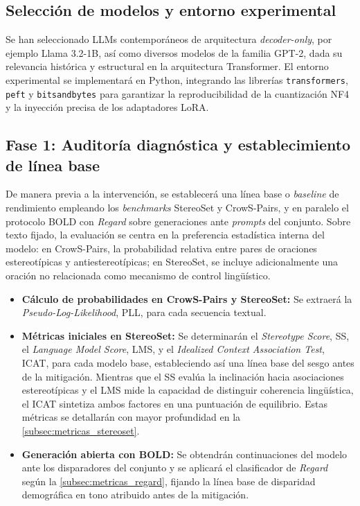 \documentclass[12pt,a4paper]{report}
\begin{document}
\subsection{Selección de modelos y entorno experimental}
\label{subsec:seleccion_entorno}

Se han seleccionado LLMs contemporáneos de arquitectura \textit{decoder-only}, por ejemplo Llama 3.2-1B, así como diversos modelos de la familia GPT-2, dada su relevancia histórica y estructural en la arquitectura Transformer. El entorno experimental se implementará en Python, integrando las librerías \texttt{transformers}, \texttt{peft} y \texttt{bitsandbytes} para garantizar la reproducibilidad de la cuantización NF4 y la inyección precisa de los adaptadores LoRA.

\subsection{Fase 1: Auditoría diagnóstica y establecimiento de línea base}
\label{subsec:fase_deteccion}

De manera previa a la intervención, se establecerá una línea base o \textit{baseline} de rendimiento empleando los \textit{benchmarks} StereoSet y CrowS-Pairs, y en paralelo el protocolo BOLD con \textit{Regard} sobre generaciones ante \textit{prompts} del conjunto. Sobre texto fijado, la evaluación se centra en la preferencia estadística interna del modelo: en CrowS-Pairs, la probabilidad relativa entre pares de oraciones estereotípicas y antiestereotípicas; en StereoSet, se incluye adicionalmente una oración no relacionada como mecanismo de control lingüístico.

\begin{itemize}
    \item \textbf{Cálculo de probabilidades en CrowS-Pairs y StereoSet:} Se extraerá la \textit{Pseudo-Log-Likelihood}, PLL, para cada secuencia textual.
    \item \textbf{Métricas iniciales en StereoSet:} Se determinarán el \textit{Stereotype Score}, SS, el \textit{Language Model Score}, LMS, y
    el \textit{Idealized Context Association Test}, ICAT, para cada modelo base, estableciendo así una línea base del sesgo antes de la mitigación.
    Mientras que el SS evalúa la inclinación hacia asociaciones estereotípicas y el LMS mide la capacidad de distinguir coherencia lingüística, 
    el ICAT sintetiza ambos factores en una puntuación de equilibrio. Estas métricas se detallarán con mayor profundidad en la 
    \autoref{subsec:metricas_stereoset}.
    \item \textbf{Generación abierta con BOLD:} Se obtendrán continuaciones del modelo ante los disparadores del conjunto y se aplicará el clasificador de \textit{Regard} según la \autoref{subsec:metricas_regard}, fijando la línea base de disparidad demográfica en tono atribuido antes de la mitigación.
\end{itemize}
\end{document}
